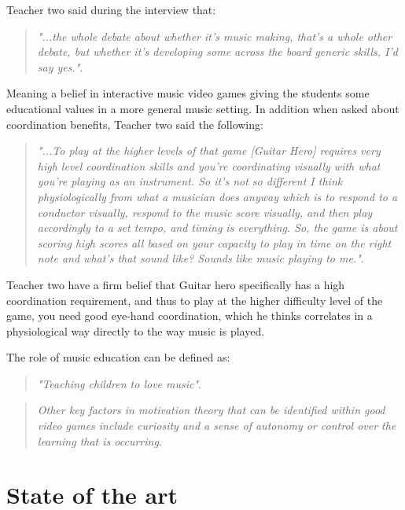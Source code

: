 	Teacher two said during the interview that:
	\begin{quote}
		\textit{"...the whole debate about whether it’s music making, that’s a whole other debate, but whether it’s developing some across the board generic skills, I’d say yes."}\cite[p.~98]{interactiveMusicVideoGames}.\\
	\end{quote}
	Meaning a belief in interactive music video games giving the students some educational values in a more general music setting. In addition when asked about coordination benefits, Teacher two said the following:
	\begin{quote}
		\textit{"...To play at the higher levels of that game [Guitar Hero] requires very high level coordination skills and you’re coordinating visually with what you’re playing as an instrument. So it’s not so different I think physiologically from what a musician does anyway which is to respond to a conductor visually, respond to the music score visually, and then play accordingly to a set tempo, and timing is everything. So, the game is about scoring high scores all based on your capacity to play in time on the right note and what’s that sound like? Sounds like music playing to me."}\cite[p.~98]{interactiveMusicVideoGames}.\\
	\end{quote}
	Teacher two have a firm belief that Guitar hero specifically has a high coordination requirement, and thus to play at the higher difficulty level of the game, you need good eye-hand coordination, which he thinks correlates in a physiological way directly to the way music is played.
	
	The role of music education can be defined as:
	\begin{quote}
		\textit{"Teaching children to love music"}\cite[p.~94]{interactiveMusicVideoGames}.\\
	\end{quote}
	
	\begin{quote}
		\textit{Other key factors in motivation theory that can be identified within good video games include curiosity and a sense of autonomy or control over the learning that is occurring}\cite[p.~92]{interactiveMusicVideoGames}.\\
	\end{quote}
	
	\cite{constructivism}

\section{State of the art}\label{sec:sota}
